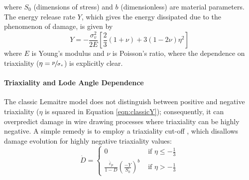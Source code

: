 \documentclass[sn-mathphys,Numbered,draft]{sn-jnl}%
\begin{document}
where $S_0$ (dimensions of stress) and $b$ (dimensionless) are material parameters.
The energy release rate $Y$, which gives the energy dissipated due to the phenomenon of damage, is given by \cite{lemaitre_engineering_2005}
\begin{equation} \label{eqn:classicY}
	Y
	=
	-\frac{\sigma_v^2}{2E}
	\left[
	\frac{2}{3} (1 + \nu) + 3 (1 - 2\nu) \eta^2
	\right]
\end{equation}
where $E$ is Young's modulus and $\nu$ is Poisson's ratio, where the dependence on triaxiality ($\eta = \sfrac{p}{\sigma_{v}}$) is explicitly clear.


\paragraph{Triaxiality and Lode Angle Dependence}

The classic Lemaitre model does not distinguish between positive and negative triaxiality ($\eta$ is squared in Equation \ref{eqn:classicY}); consequently, it can overpredict damage in wire drawing processes where triaxiality can be highly negative.
A simple remedy is to employ a triaxiality cut-off \cite{bouchard_enhanced_2011}, which disallows damage evolution for highly negative triaxiality values:
\begin{equation} \label{eq:triaxCutoff} %
	\dot{D} =
	\begin{cases}
		0 & \text { if } \eta \leq -\frac{1}{3}  \\
		\frac{\dot{\bar{\varepsilon}}_p}{1 - D}\left(\frac{-Y}{S_0}\right)^b 
		& \text { if } \eta>-\frac{1}{3}
	\end{cases}
\end{equation}
\end{document}
